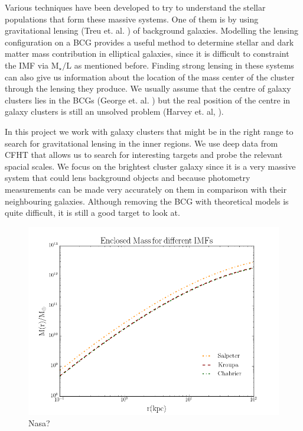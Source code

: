 Various techniques have been developed to try to understand the stellar populations that form these massive systems. One of them is by using gravitational lensing (Treu et. al. \citeyear{Reference1})  of  background galaxies. Modelling the lensing configuration on a BCG provides a useful method to determine stellar and dark matter mass contribution in elliptical galaxies, since it is difficult to constraint the IMF via $\textrm{M}_{\star}/\text{L}$ as mentioned before. Finding strong lensing in these systems can also give us information about the location of the mass center of the cluster through the lensing they produce. We usually assume that the centre of galaxy clusters lies in the BCGs (George et. al. \citeyear{Reference18}) but the real position of the centre in galaxy clusters is still an unsolved problem (Harvey et. al, \citeyear{Reference13}). 

In this project we work with galaxy clusters that might be in the right range to search for gravitational lensing in the inner regions. We use deep data from CFHT that allows us to search for interesting targets and probe the relevant spacial scales. We focus on the brightest cluster galaxy since it is a very massive system that could lens background objects and because photometry measurements can be made very accurately on them in comparison with their neighbouring galaxies. Although removing the BCG with theoretical models is quite difficult, it is still a good target to look at. 
   
\begin{figure}[H]
\centering
\includegraphics[width=12cm]{images/Enclosed_Mass_IMFs.png}
\caption[Strong Lensing representation]{Nasa?}
\end{figure}   
   
\newpage
